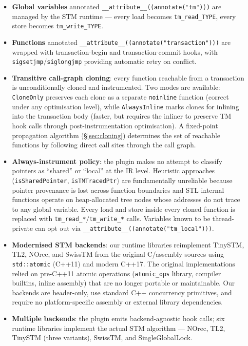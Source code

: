 \documentclass[article,12pt]{article}
\begin{document}
\begin{itemize}
\item \textbf{Global variables} annotated \texttt{\_\_attribute\_\_((annotate("tm")))}
  are managed by the STM runtime --- every load becomes \texttt{tm\_read\_TYPE}, every
  store becomes \texttt{tm\_write\_TYPE}.
\item \textbf{Functions} annotated
  \texttt{\_\_attribute\_\_((annotate("transaction")))} are wrapped with
  transaction-begin and transaction-commit hooks, with \texttt{sigsetjmp}/\texttt{siglongjmp}
  providing automatic retry on conflict.
\item \textbf{Transitive call-graph cloning}: every function reachable from a
transaction is unconditionally cloned and instrumented.  Two modes are available:
\texttt{CloneOnly} preserves each clone as a separate \texttt{noinline} function
(correct under any optimisation level), while \texttt{AlwaysInline} marks clones
for inlining into the transaction body (faster, but requires the inliner to
preserve TM hook calls through post-instrumentation optimisation).
A fixed-point propagation algorithm (\S\ref{sec:cloning}) determines the set of
reachable functions by following direct call sites through the call graph.

\item \textbf{Always-instrument policy}: the plugin makes no attempt to
classify pointers as ``shared'' or ``local'' at the IR level.  Heuristic
approaches (\texttt{isSharedPointer}, \texttt{isTMTracedPtr}) are fundamentally
unreliable because pointer provenance is lost across function boundaries and STL
internal functions operate on heap-allocated tree nodes whose addresses do not
trace to any global variable.  Every load and store inside every cloned function
is replaced with \texttt{tm\_read\_*}/\texttt{tm\_write\_*} calls.  Variables known
to be thread-private can opt out via
\texttt{\_\_attribute\_\_((annotate("tm\_local")))}.

\item \textbf{Modernised STM backends}: our runtime libraries reimplement TinySTM,
  TL2, NOrec, and SwissTM from the original C/assembly sources using
  \texttt{std::atomic} (C++11) and modern C++17.  The original implementations
  relied on pre-C++11 atomic operations (\texttt{atomic\_ops} library,
  compiler builtins, inline assembly) that are no longer portable or
  maintainable.  Our backends are header-only, use standard C++ concurrency
  primitives, and require no platform-specific assembly or external library
  dependencies.
\item \textbf{Multiple backends}: the plugin emits backend-agnostic hook calls; six runtime
  libraries implement the actual STM algorithm --- NOrec, TL2, TinySTM (three variants),
  SwissTM, and SingleGlobalLock.
\end{itemize}
\end{document}
